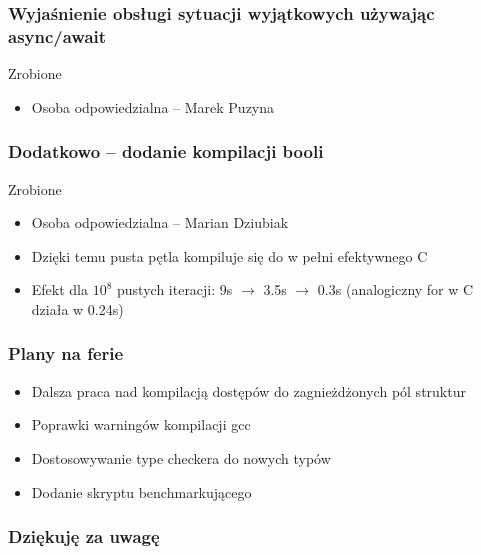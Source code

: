 \documentclass{beamer}
\begin{document}
	\begin{frame}
		\frametitle{Wyjaśnienie obsługi sytuacji wyjątkowych używając async/await}
		\color{green} Zrobione
		\begin{itemize}
			\item Osoba odpowiedzialna -- Marek Puzyna
		\end{itemize}
	\end{frame}

	\begin{frame}
		\frametitle{Dodatkowo -- dodanie kompilacji booli}
		\color{green} Zrobione
		\begin{itemize}
			\item Osoba odpowiedzialna -- Marian Dziubiak
			\item Dzięki temu pusta pętla kompiluje się do w pełni efektywnego C
			\item Efekt dla $10^8$ pustych iteracji: 9s $\rightarrow$ 3.5s $\rightarrow$ 0.3s (analogiczny for w C działa w 0.24s)
		\end{itemize}
	\end{frame}

	\begin{frame}
		\frametitle{Plany na ferie}
		\begin{itemize}
			\item Dalsza praca nad kompilacją dostępów do zagnieżdżonych pól struktur
			\item Poprawki warningów kompilacji gcc
			\item Dostosowywanie type checkera do nowych typów
			\item Dodanie skryptu benchmarkującego
		\end{itemize}
	\end{frame}
	
	\begin{frame}
	 \frametitle{Dziękuję za uwagę}
	\end{frame}
\end{document}
